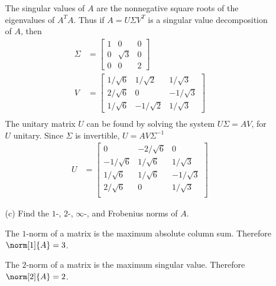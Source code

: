 \documentclass[11pt]{article}
\begin{document}
\begin{enumerate}
\begin{enumerate}
                The singular values of $A$ are the nonnegative square roots of
                the eigenvalues of $A^T A$.
                Thus if $A = U \Sigma V^T$ is a singular value decomposition of
                $A$, then
                \begin{align*}
                    \Sigma &=
                    \begin{bmatrix}
                        1 & 0 & 0 \\
                        0 & \sqrt{3} & 0 \\
                        0 & 0 & 2
                    \end{bmatrix} \\
                    V &=
                    \begin{bmatrix}
                        1/\sqrt{6} & 1/\sqrt{2}  & 1/\sqrt{3} \\
                        2/\sqrt{6} & 0           & -1/\sqrt{3} \\
                        1/\sqrt{6} & -1/\sqrt{2} & 1/\sqrt{3}
                    \end{bmatrix} \\
                \end{align*}
                The unitary matrix $U$ can be found by solving the system
                $U\Sigma = AV$, for $U$ unitary.
                Since $\Sigma$ is invertible, $U = AV\Sigma^{-1}$
                \begin{align*}
                    U &=
                    \begin{bmatrix}
                        0 & -2/\sqrt{6} & 0 \\
                        -1/\sqrt{6} & 1/\sqrt{6} & 1/\sqrt{3} \\
                        1/\sqrt{6} & 1/\sqrt{6} & -1/\sqrt{3} \\
                        2/\sqrt{6} & 0 & 1/\sqrt{3} \\
                    \end{bmatrix}
                \end{align*}

            \item[(c)] %
                Find the $1$-, $2$-, $\infty$-, and Frobenius norms of $A$.

                The $1$-norm of a matrix is the maximum absolute column sum.
                Therefore $\norm[1]{A} = 3$.

                The $2$-norm of a matrix is the maximum singular value.
                Therefore $\norm[2]{A} = 2$.


\end{enumerate}
\end{enumerate}
\end{document}
